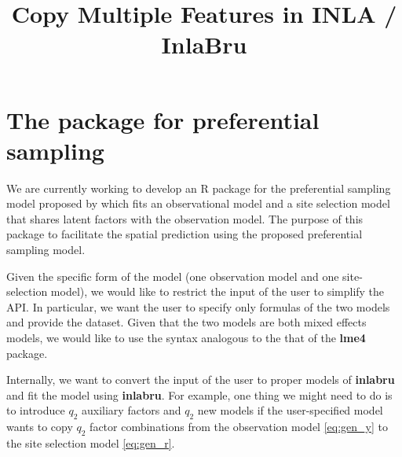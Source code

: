 \documentclass{article}
\title{Copy Multiple Features in INLA / InlaBru}
\begin{document}
\maketitle

\section{The package for preferential sampling}
We are currently working to develop an R package for the preferential sampling model proposed
by \cite{Watson2019_pref_samp} which fits an observational model and a site selection model
that shares latent factors with the observation model. 
The purpose of this package to facilitate the spatial prediction using the proposed preferential
sampling model.

Given the specific form of the model (one observation model and one site-selection model), 
we would like to restrict the input of the user to simplify the API. 
In particular, we want the user to specify only formulas of the two models and provide the dataset. 
Given that the two models are both mixed effects models, we would like to use the syntax
analogous to the that of the \textbf{lme4} package.

Internally, we want to convert the input of the user to proper models of \textbf{inlabru} and fit
the model using \textbf{inlabru}. For example, one thing we might need to do is to introduce
$q_2$ auxiliary factors and $q_2$ new models if the user-specified model wants to copy $q_2$
factor combinations from the observation model \cref{eq:gen_y} to the site selection model \cref{eq:gen_r}.

%
%
\end{document}
